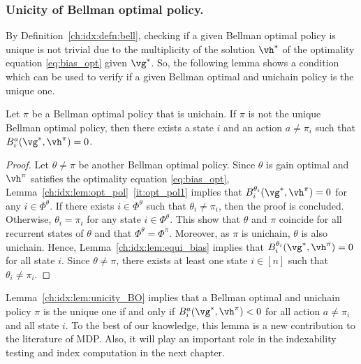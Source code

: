 \subsubsection{Unicity of Bellman optimal policy.}
\label{ch:idx:sssec:unicity}

By Definition~\ref{ch:idx:defn:bell}, checking if a given Bellman optimal policy is unique is not trivial due to the multiplicity of the solution $\vh^*$ of the optimality equation \eqref{eq:bias_opt} given $\vg^*$.
So, the following lemma shows a condition which can be used to verify if a given Bellman optimal and unichain policy is the unique one.
\begin{lem}
    \label{ch:idx:lem:unicity_BO}
    Let $\pi$ be a Bellman optimal policy that is unichain. If $\pi$ is not the unique Bellman optimal policy, then there exists a state $i$ and an action $a\neq\pi_i$ such that $B_i^a(\vg^*,\vh^\pi)=0$.
\end{lem}

\begin{proof}
    Let $\theta\neq\pi$ be another Bellman optimal policy.
    Since $\theta$ is gain optimal and $\vh^\pi$ satisfies the optimality equation \eqref{eq:bias_opt}, Lemma~\ref{ch:idx:lem:opt_pol}~\ref{it:opt_pol1} implies that $B_i^{\theta_i}(\vg^*,\vh^\pi) =0$ for any $i\in\Phi^\theta$.
    If there exists $i\in\Phi^\theta$ such that $\theta_i\neq\pi_i$, then the proof is concluded.
    Otherwise, $\theta_i=\pi_i$ for any state $i\in\Phi^\theta$.
    This show that $\theta$ and $\pi$ coincide for all recurrent states of $\theta$ and that $\Phi^\theta=\Phi^\pi$.
    Moreover, as $\pi$ is unichain, $\theta$ is also unichain.
    Hence, Lemma~\ref{ch:idx:lem:equi_bias} implies that $B_i^{\theta_i}(\vg^*, \vh^\pi)=0$ for all state $i$.
    Since $\theta\neq\pi$, there exists at least one state $i\in[n]$ such that $\theta_i\neq\pi_i$.
\end{proof}
Lemma~\ref{ch:idx:lem:unicity_BO} implies that a Bellman optimal and unichain policy $\pi$ is the unique one if and only if $B_i^a(\vg^*, \vh^\pi)<0$ for all action $a\neq\pi_i$ and all state $i$.
To the best of our knowledge, this lemma is a new contribution to the literature of MDP.
Also, it will play an important role in the indexability testing and index computation in the next chapter.

